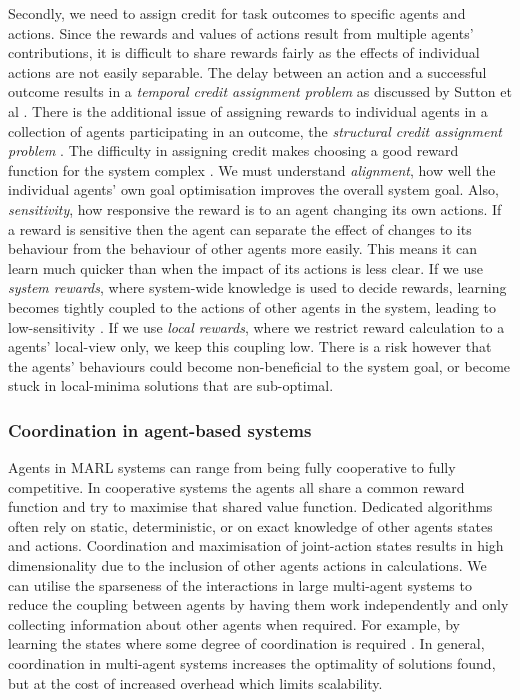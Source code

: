 Secondly, we need to assign credit for task outcomes to specific agents and actions. Since the rewards and values of actions result from multiple agents' contributions, it is difficult to share rewards fairly as the effects of individual actions are not easily separable. The delay between an action and a successful outcome results in a \textit{temporal credit assignment problem} as discussed by Sutton et al \cite{Sutton1984}. There is the additional issue of assigning rewards to individual agents in a collection of agents participating in an outcome, the \textit{structural credit assignment problem} \cite{Zhong2003, Agogino2005}. The difficulty in assigning credit makes choosing a good reward function for the system complex \cite{Mao2020}. We must understand \textit{alignment}, how well the individual agents' own goal optimisation improves the overall system goal. Also, \textit{sensitivity}, how responsive the reward is to an agent changing its own actions. If a reward is sensitive then the agent can separate the effect of changes to its behaviour from the behaviour of other agents more easily. This means it can learn much quicker than when the impact of its actions is less clear. If we use \textit{system rewards}, where system-wide knowledge is used to decide rewards, learning becomes tightly coupled to the actions of other agents in the system, leading to low-sensitivity \cite{WOLPERT2001}. If we use \textit{local rewards}, where we restrict reward calculation to a agents' local-view only, we keep this coupling low. There is a risk however that the agents' behaviours could become non-beneficial to the system goal, or become stuck in local-minima solutions that are sub-optimal. 
\subsubsection*{Coordination in agent-based systems}
Agents in MARL systems can range from being fully cooperative to fully competitive. In cooperative systems the agents all share a common reward function and try to maximise that shared value function. Dedicated algorithms often rely on static, deterministic, or on exact knowledge of other agents states and actions. Coordination and maximisation of joint-action states results in high dimensionality due to the inclusion of other agents actions in calculations. We can utilise the sparseness of the interactions in large multi-agent systems to reduce the coupling between agents by having them work independently and only collecting information about other agents when required. For example, by learning the states where some degree of coordination is required \cite{Melo2009, DeHauwere2010, DeHauwere2012}. In general, coordination in multi-agent systems increases the optimality of solutions found, but at the cost of increased overhead which limits scalability.

